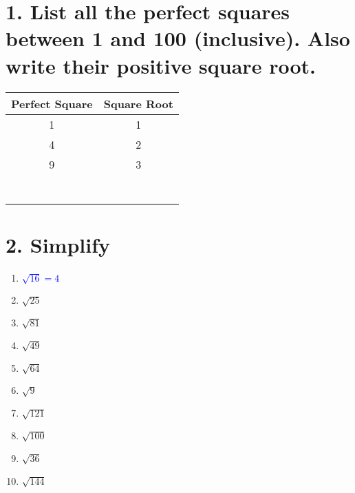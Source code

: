 \documentclass{hw}
\begin{document}
\section*{\normalsize 1. List all the perfect squares between 1 and 100 (inclusive). Also write their positive square root.}
\renewcommand{\arraystretch}{2} %
\begin{center}
\begin{tabular}{|c|c|}
    \hline
    Perfect Square & Square Root \\
    \hline
    1 & 1 \\
    \hline
    4 & 2 \\
    \hline
    9 & 3 \\
    \hline
    & \\
    \hline
    & \\
    \hline
    & \\
    \hline
    & \\
    \hline
    & \\
    \hline
    & \\
    \hline
    & \\
    \hline
\end{tabular}
\end{center}


\section*{\normalsize 2. Simplify}
\begin{enumerate}[label=\alph*.]
    \item \textcolor{blue}{$\sqrt{16} = 4$}
        \studentworkspace
    \item $\sqrt{25}$
        \studentworkspace
    \item $\sqrt{81}$
        \studentworkspace
    \item $\sqrt{49}$
        \studentworkspace
    \item $\sqrt{64}$
        \studentworkspace
    \item $\sqrt{9}$
        \studentworkspace
    \item $\sqrt{121}$
        \studentworkspace
    \item $\sqrt{100}$
        \studentworkspace
    \item $\sqrt{36}$
        \studentworkspace
    \item $\sqrt{144}$
        \studentworkspace
\end{enumerate}
\end{document}

